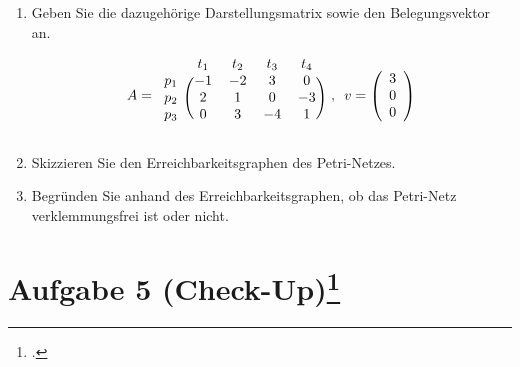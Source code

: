 \documentclass{lehramt-informatik-haupt}
\begin{document}
\begin{enumerate}


\item Geben Sie die dazugehörige Darstellungsmatrix sowie den
Belegungsvektor an.

\begin{antwort}
\begin{displaymath}
A =
\begin{blockarray}{ccccc}
      & t_1 & t_2 & t_3 & t_4 \\
  \begin{block}{c(cccc)}
  p_1 & -1  & -2  & 3   & 0 \\
  p_2 & 2   & 1   & 0   & -3 \\
  p_3 & 0   & 3   & -4  & 1 \\
  \end{block}
\end{blockarray}
\enspace
,
\enspace
v =
\left(
  \begin{array}{c}
  3 \\
  0 \\
  0
  \end{array}
\right)
\end{displaymath}
\end{antwort}


\item Skizzieren Sie den Erreichbarkeitsgraphen des Petri-Netzes.

\begin{antwort}

\end{antwort}


\item Begründen Sie anhand des Erreichbarkeitsgraphen, ob das Petri-Netz
verklemmungsfrei ist oder nicht.

\begin{antwort}

\end{antwort}
\end{enumerate}

%

\section{Aufgabe 5 (Check-Up)\footcite[Seite 3]{sosy:ab:4}}
\end{document}
